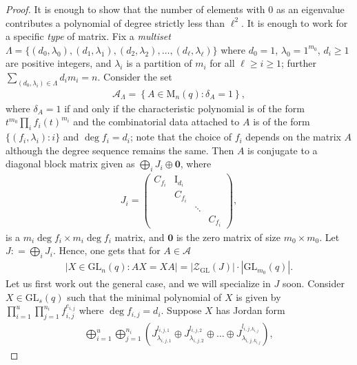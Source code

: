 \documentclass[11pt,twoside]{amsart}
\newcommand{\GL}{\mathrm{GL}}
\newcommand{\M}{\mathrm{M}}
\newcommand{\Zen}{\mathscr{Z}}
\newcommand{\I}{\operatorname{I}}
\theoremstyle{definition} %
\begin{document}
\begin{proof}
    It is enough to show that the number of elements with $0$ as an eigenvalue contributes a polynomial of degree strictly less than $\ell^2$.
    It is enough to work for a specific \emph{type} of matrix. 
    Fix a \textit{multiset} $\Lambda=\{(d_0,\lambda_0),(d_1,\lambda_1),(d_2,\lambda_2),\ldots, (d_\ell,\lambda_\ell)\}$ where $d_0=1$, $\lambda_0=1^{m_0}$, $d_i\geq 1$ are positive integers, and $\lambda_i$ is a partition of $m_i$ for all $\ell\geq i\geq 1$; further $\sum\limits_{(d_0,\lambda_i)\in\Lambda} d_im_i=n$.
    Consider the set
    \begin{align*}
        \mathscr A_\Lambda=\left\{A\in \M_n(q):\delta_A=1\right\},
    \end{align*}
    where $\delta_A=1$ if and only if the characteristic polynomial is of the form $t^{m_0}\prod\limits_{i} f_i(t)^{m_i}$ and the combinatorial data attached to $A$ is of the form $\{(f_i,\lambda_i):i\}$ and $\deg f_i=d_i$; note that the choice of $f_i$ depends on the matrix $A$ although the degree sequence remains the same. 
    Then $A$ is conjugate to a diagonal block matrix given as $\bigoplus\limits_{i} J_i\oplus \mathbf 0$, where
    \begin{align*}
        J_i=\begin{pmatrix}
            C_{f_i}&\I_{d_i}&&\\
            &C_{f_i}&&\\
            &&\ddots&\\
            &&&C_{f_i}
        \end{pmatrix},
    \end{align*}
    is a $m_i\deg f_i\times m_i\deg f_i$ matrix, and $\mathbf{0}$ is the zero matrix of size $m_0\times m_0$. 
    Let $J\colon = \bigoplus\limits_{i}J_i.$
    Hence, one gets that for $A\in\mathscr A$
    \begin{align*}
    \left|X\in\GL_n(q):AX=XA\right|=|\Zen_{\GL}(J)|\cdot |\GL_{m_0}(q)|.
    \end{align*}
    Let us first work out the general case, and we will specialize in $J$ soon.
    Consider $X\in \GL_s(q)$ such that the minimal polynomial of $X$ is given by $\prod\limits_{i=1}^{u}\prod\limits_{j=1}^{n_i}f_{i,j}^{e_{i,j}}$ where $\deg f_{i,j}=d_i$.
    Suppose $X$ has Jordan form
    \begin{align*}
        \bigoplus\limits_{i=1}^{u}\bigoplus\limits_{j=1}^{n_i}\left(J_{\lambda_{i,j,1}}^{l_{i,j,1}}\oplus J_{\lambda_{i,j,2}}^{l_{i,j,2}}\oplus\ldots\oplus J_{\lambda_{i,j,k_{i,j}}}^{l_{i,j,k_{i,j}}}\right),

\end{align*}
\end{proof}
\end{document}
